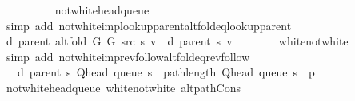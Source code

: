 \begin{isabellebody}
\ \ \ \ \ \ \ \ \isamarkupfalse%
\ not{\isacharunderscore}{\kern0pt}white{\isacharunderscore}{\kern0pt}head{\isacharunderscore}{\kern0pt}queue\isanewline
\ \ \ \ \ \ \ \ \isamarkupfalse%
\ {\isacharparenleft}{\kern0pt}simp\ add{\isacharcolon}{\kern0pt}\ not{\isacharunderscore}{\kern0pt}white{\isacharunderscore}{\kern0pt}imp{\isacharunderscore}{\kern0pt}lookup{\isacharunderscore}{\kern0pt}parent{\isacharunderscore}{\kern0pt}alt{\isacharunderscore}{\kern0pt}fold{\isacharunderscore}{\kern0pt}eq{\isacharunderscore}{\kern0pt}lookup{\isacharunderscore}{\kern0pt}parent{\isacharparenright}{\kern0pt}\isanewline
\ \ \ \ \isamarkupfalse%
\isanewline
\ \ \ \ \isanewline
\ \ \ \ \isamarkupfalse%
\ {\isachardoublequoteopen}d\ {\isacharparenleft}{\kern0pt}parent\ {\isacharparenleft}{\kern0pt}alt{\isacharunderscore}{\kern0pt}fold\ G{}\ G{}\ src\ s{\isacharparenright}{\kern0pt}{\isacharparenright}{\kern0pt}\ v\ {\isacharequal}{\kern0pt}\ d\ {\isacharparenleft}{\kern0pt}parent\ s{\isacharparenright}{\kern0pt}\ v{\isachardoublequoteclose}\isanewline
\ \ \ \ \ \ \isamarkupfalse%
\ white{\isacharunderscore}{\kern0pt}not{\isacharunderscore}{\kern0pt}white\isanewline
\ \ \ \ \ \ \isamarkupfalse%
\ {\isacharparenleft}{\kern0pt}simp\ add{\isacharcolon}{\kern0pt}\ not{\isacharunderscore}{\kern0pt}white{\isacharunderscore}{\kern0pt}imp{\isacharunderscore}{\kern0pt}rev{\isacharunderscore}{\kern0pt}follow{\isacharunderscore}{\kern0pt}alt{\isacharunderscore}{\kern0pt}fold{\isacharunderscore}{\kern0pt}eq{\isacharunderscore}{\kern0pt}rev{\isacharunderscore}{\kern0pt}follow{\isacharparenright}{\kern0pt}\isanewline
\ \ \ \ \isamarkupfalse%
\ \isamarkupfalse%
\ {\isachardoublequoteopen}{\isachardot}{\kern0pt}{\isachardot}{\kern0pt}{\isachardot}{\kern0pt}\ {\isasymle}\ d\ {\isacharparenleft}{\kern0pt}parent\ s{\isacharparenright}{\kern0pt}\ {\isacharparenleft}{\kern0pt}Q{\isacharunderscore}{\kern0pt}head\ {\isacharparenleft}{\kern0pt}queue\ s{\isacharparenright}{\kern0pt}{\isacharparenright}{\kern0pt}\ {\isacharplus}{\kern0pt}\ path{\isacharunderscore}{\kern0pt}length\ {\isacharparenleft}{\kern0pt}Q{\isacharunderscore}{\kern0pt}head\ {\isacharparenleft}{\kern0pt}queue\ s{\isacharparenright}{\kern0pt}\ {\isacharhash}{\kern0pt}\ p{\isacharparenright}{\kern0pt}{\isachardoublequoteclose}\isanewline
\ \ \ \ \ \ \isamarkupfalse%
\ not{\isacharunderscore}{\kern0pt}white{\isacharunderscore}{\kern0pt}head{\isacharunderscore}{\kern0pt}queue\ white{\isacharunderscore}{\kern0pt}not{\isacharunderscore}{\kern0pt}white\ alt{\isacharunderscore}{\kern0pt}path{\isacharunderscore}{\kern0pt}Cons\isanewline

\end{isabellebody}
